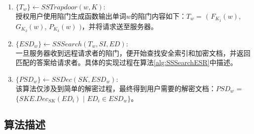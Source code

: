 \begin{enumerate}
      \item
      \textbf{ $ \{ T_w \} \leftarrow SSTrapdoor(w, K): $ }\\
      授权用户使用陷门生成函数输出单词$w$的陷门内容如下：$ T_w =$ $($ $F_{K_1}(w)$, $G_{K_2}(w)$, $P_{K_3}(w)$ $)$，并将请求送至服务器。


      \item
      \textbf{$ \{ ESD_w \} \leftarrow SSSearch(T_w, SI, ED): $} \\
      一旦服务器收到远程请求者的陷门，便开始查找安全索引和加密文档，并返回匹配的答案给请求者。具体的实现过程在算法\ref{alg:SSSearchESR}中描述。


      \item
      \textbf{${ \{PSD_w\} \leftarrow SSDec(SK, ESD_w): }$} \\
      该算法仅涉及到简单的解密过程，最终得到用户需要的解密文档：$PSD_w$ = $\{ SKE.Dec_{SK}(ED_i)  $ $|$ $ ED_i \in ESD_w \} $。

    \end{enumerate}

\subsection{\textbf{算法描述}}
\label{sec:synonym_sheme_algorithm}


